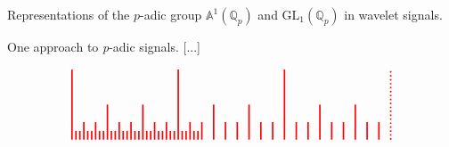 \documentclass[letterpaper,11pt, reqno]{amsart}
\newtheorem{monodromy theorem}{Monodromy Theorem}[subsection]
\newtheorem{wild conjecture}[theorem]{Wild Conjecture}
\newtheorem{research objectives}{Research objectives}[subsection]
\newtheorem{research question}[theorem]{Research questions}
\newtheorem{aside question}[theorem]{Aside question}
\newtheorem{audio example}[theorem]{\loudspeaker[3] Example}
\newtheorem{blank remark}[theorem]{}
\newtheorem{terminology and comment}[theorem]{Terminology and comment}
\newtheorem{purity hypothesis}[theorem]{Purity hypothesis}
\newtheorem{corollary of the purity hypothesis}[theorem]{Corollary of the purity hypothesis}
\numberwithin{equation}{theorem}
\begin{document}
\begin{section}{Representations of the $p$-adic group $\mathbb{A}^{\!1}(\mathbb{Q}_{p})$
and $\text{GL}_{1}(\mathbb{Q}_{p})$
in wavelet signals.}
\begin{subsection}{One approach to {\em p}-adic signals.}
{\color{red} [...]}
	\begin{figure}[ht]
	$$
	\begin{tikzpicture}
	\draw[red, very thick] (0,0) -- (0,2);
	\draw[red, very thick] (3,0) -- (3,2);
	\draw[red, very thick] (6,0) -- (6,2);
	\draw[red, very thick, dotted] (9,0) -- (9,2);
	\draw[red, very thick] (1,0) -- (1,1);
	\draw[red, very thick] (2,0) -- (2,1);
	\draw[red, very thick] (4,0) -- (4,1);
	\draw[red, very thick] (5,0) -- (5,1);
	\draw[red, very thick] (7,0) -- (7,1);
	\draw[red, very thick] (8,0) -- (8,1);
	\draw[red, very thick] (1/3,0) -- (1/3,.5);
	\draw[red, very thick] (2/3,0) -- (2/3,.5);
	\draw[red, very thick] (1+1/3,0) -- (1+1/3,.5);
	\draw[red, very thick] (1+2/3,0) -- (1+2/3,.5);
	\draw[red, very thick] (2+1/3,0) -- (2+1/3,.5);
	\draw[red, very thick] (2+2/3,0) -- (2+2/3,.5);
	\draw[red, very thick] (3+1/3,0) -- (3+1/3,.5);
	\draw[red, very thick] (3+2/3,0) -- (3+2/3,.5);
	\draw[red, very thick] (4+1/3,0) -- (4+1/3,.5);
	\draw[red, very thick] (4+2/3,0) -- (4+2/3,.5);
	\draw[red, very thick] (5+1/3,0) -- (5+1/3,.5);
	\draw[red, very thick] (5+2/3,0) -- (5+2/3,.5);
	\draw[red, very thick] (6+1/3,0) -- (6+1/3,.5);
	\draw[red, very thick] (6+2/3,0) -- (6+2/3,.5);
	\draw[red, very thick] (7+1/3,0) -- (7+1/3,.5);
	\draw[red, very thick] (7+2/3,0) -- (7+2/3,.5);
	\draw[red, very thick] (8+1/3,0) -- (8+1/3,.5);
	\draw[red, very thick] (8+2/3,0) -- (8+2/3,.5);
	\draw[red, very thick] (1/9,0) -- (1/9,.25);
	\draw[red, very thick] (2/9,0) -- (2/9,.25);
	\draw[red, very thick] (1/3+1/9,0) -- (1/3+1/9,.25);
	\draw[red, very thick] (1/3+2/9,0) -- (1/3+2/9,.25);
	\draw[red, very thick] (2/3+1/9,0) -- (2/3+1/9,.25);
	\draw[red, very thick] (2/3+2/9,0) -- (2/3+2/9,.25);
	\draw[red, very thick] (3/3+1/9,0) -- (3/3+1/9,.25);
	\draw[red, very thick] (3/3+2/9,0) -- (3/3+2/9,.25);
	\draw[red, very thick] (4/3+1/9,0) -- (4/3+1/9,.25);
	\draw[red, very thick] (4/3+2/9,0) -- (4/3+2/9,.25);
	\draw[red, very thick] (5/3+1/9,0) -- (5/3+1/9,.25);
	\draw[red, very thick] (5/3+2/9,0) -- (5/3+2/9,.25);
	\draw[red, very thick] (6/3+1/9,0) -- (6/3+1/9,.25);
	\draw[red, very thick] (6/3+2/9,0) -- (6/3+2/9,.25);
	\draw[red, very thick] (7/3+1/9,0) -- (7/3+1/9,.25);
	\draw[red, very thick] (7/3+2/9,0) -- (7/3+2/9,.25);
	\draw[red, very thick] (8/3+1/9,0) -- (8/3+1/9,.25);
	\draw[red, very thick] (8/3+2/9,0) -- (8/3+2/9,.25);
	\draw[red, very thick] (9/3+1/9,0) -- (9/3+1/9,.25);
	\draw[red, very thick] (9/3+2/9,0) -- (9/3+2/9,.25);
	\draw[red, very thick] (10/3+1/9,0) -- (10/3+1/9,.25);
	\draw[red, very thick] (10/3+2/9,0) -- (10/3+2/9,.25);

\end{tikzpicture}$$
\end{figure}
\end{subsection}
\end{section}
\end{document}
